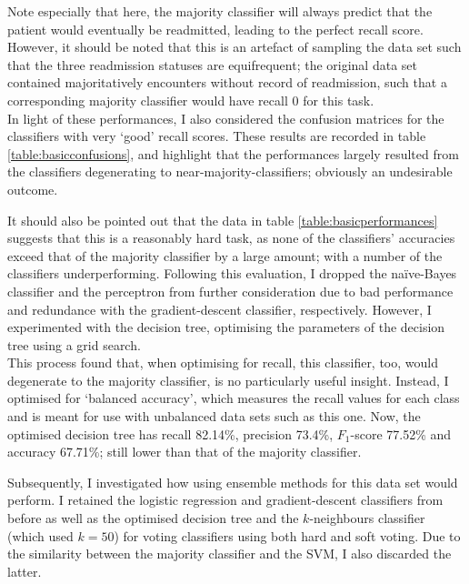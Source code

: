 \documentclass[10pt, twoside, a4paper]{article}
\begin{document}
	Note especially that here, the majority classifier will always predict that the patient 
	would eventually be readmitted, leading to the perfect recall score. 
	However, it should be noted that this is an 
	artefact of sampling the data set such that the three readmission statuses are 
	equifrequent; the original data set contained majoritatively encounters without 
	record of readmission, such that a corresponding majority classifier would have recall 0 
	for this task.
	\\
	In light of these performances, I also considered the confusion matrices for the 
	classifiers with very `good' recall scores. These 
	results are recorded in table \ref{table:basicconfusions}, and highlight that the 
	performances largely resulted from the classifiers degenerating to 
	near-majority-classifiers; obviously an undesirable outcome. 

	It should also be pointed out that the data in table \ref{table:basicperformances} suggests 
	that this is a reasonably hard task, as none of the classifiers' accuracies 
	exceed that of the majority classifier by a large amount; with a number of the classifiers 
	underperforming. Following this evaluation, I dropped the 
	na\"ive-Bayes classifier and the perceptron from further consideration due to bad 
	performance and redundance with the gradient-descent classifier, respectively. However, I 
	experimented with the decision tree, optimising the parameters of the decision tree using 
	a grid search. 
	\\
	This process found that, when optimising for recall, this classifier, too, would 
	degenerate to the majority classifier, is 
	no particularly useful insight. Instead, I optimised for `balanced 
	accuracy', which measures the recall values for each class and is meant for use with 
	unbalanced data sets such as this one. Now, the optimised decision tree has 
	recall 82.14\%, precision 73.4\%, $F_1$-score 77.52\% and accuracy 67.71\%; 
	still lower than that of the majority classifier.

	Subsequently, I investigated how using ensemble methods for this data set would 
	perform. I retained the logistic regression and gradient-descent classifiers 
	from before as well as the optimised decision tree and the $k$-neighbours classifier (which 
	used $k=50$)  for voting classifiers using both hard and soft voting.
	Due to the similarity between the majority classifier and the SVM, I also discarded the 
	latter.
\end{document}
